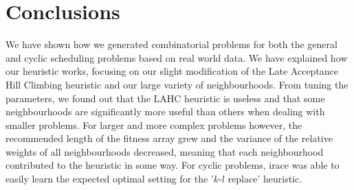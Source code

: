 \documentclass[]{article}
\begin{document}

\section{Conclusions}
We have shown how we generated combinatorial problems for both the general and cyclic scheduling problems based on real world data. We have explained how our heuristic works, focusing on our slight modification of the Late Acceptance Hill Climbing heuristic and our large variety of neighbourhoods. From tuning the parameters, we found out that the LAHC heuristic is useless and that some neighbourhoods are significantly more useful than others when dealing with smaller problems. For larger and more complex problems however, the recommended length of the fitness array grew and the variance of the relative weights of all neighbourhoods decreased, meaning that each neighbourhood contributed to the heuristic in some way. For cyclic problems, irace was able to easily learn the expected optimal setting for the '$k$-$l$ replace' heuristic.



\end{document}
